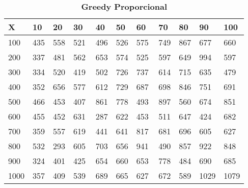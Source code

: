 \documentclass[10pt,letterpaper]{article}
\begin{document}
\begin{center}
\begin{table}\renewcommand{\arraystretch}{2.5}
\caption{\large \textbf{Greedy Proporcional}}
\centering
\begin{tabular} { |m{0.5cm}|m{1.3cm}|m{1.3cm}|m{1.3cm}|m{1.3cm}|m{1.3cm}|m{1.3cm}|m{1.3cm}|m{1.3cm}|m{1.3cm}|m{1.3cm}|} 
\hline
\rowcolor{Gray}
\centering \textbf{X} & \centering \textbf{10} & \centering \textbf{20} & \centering \textbf{30}\ & \centering \textbf{40} & \centering \textbf{50} & \centering \textbf{60}\ & \centering \textbf{70} & \centering \textbf{80} & \centering \textbf{90}\ & \textbf{100} \\\hline
\cellcolor{Gray}100 & \Large 435 & \Large 558 & \Large 521 & \Large 496 & \Large 526 & \Large 575 & \Large 749 & \Large 867 & \Large 677 & \Large 660 \\
\hline
\cellcolor{Gray}200 & \Large 337 & \Large 481 & \Large 562 & \Large 653 & \Large 574 & \Large 525 & \Large 597 & \Large 649 & \Large 994 & \Large 597 \\
\hline
\cellcolor{Gray}300 & \Large 334 & \Large 520 & \Large 419 & \Large 502 & \Large 726 & \Large 737 & \Large 614 & \Large 715 & \Large 635 & \Large 479 \\
\hline
\cellcolor{Gray}400 & \Large 352 & \Large 656 & \Large 577 & \Large 612 & \Large 729 & \Large 687 & \Large 698 & \Large 846 & \Large 751 & \Large 691 \\
\hline
\cellcolor{Gray}500 & \Large 466 & \Large 453 & \Large 407 & \Large 861 & \Large 778 & \Large 493 & \Large 897 & \Large 560 & \Large 674 & \Large 851 \\
\hline
\cellcolor{Gray}600 & \Large 455 & \Large 452 & \Large 631 & \Large 287 & \Large 622 & \Large 453 & \Large 511 & \Large 647 & \Large 424 & \Large 682 \\
\hline
\cellcolor{Gray}700 & \Large 359 & \Large 557 & \Large 619 & \Large 441 & \Large 641 & \Large 817 & \Large 681 & \Large 696 & \Large 605 & \Large 627 \\
\hline
\cellcolor{Gray}800 & \Large 532 & \Large 293 & \Large 605 & \Large 703 & \Large 656 & \Large 941 & \Large 490 & \Large 857 & \Large 922 & \Large 848 \\
\hline
\cellcolor{Gray}900 & \Large 324 & \Large 401 & \Large 425 & \Large 654 & \Large 660 & \Large 653 & \Large 778 & \Large 484 & \Large 690 & \Large 685 \\
\hline
\cellcolor{Gray}1000 & \Large 357 & \Large 409 & \Large 539 & \Large 689 & \Large 665 & \Large 627 & \Large 672 & \Large 589 & \Large 1029 & \Large 1079 \\
\hline
\end{tabular} \\
\end{table}
\end{center}
\end{document}
